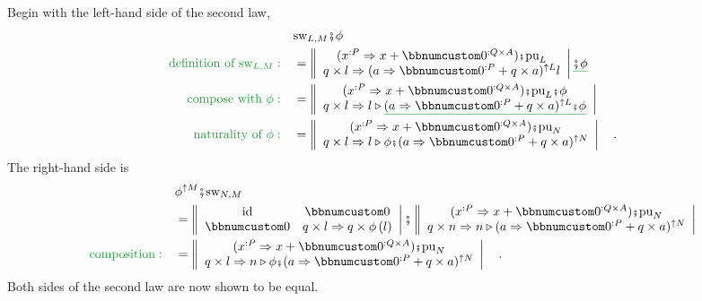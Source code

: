 Begin with the left-hand side of the second law,
\begin{align*}
 & \text{sw}_{L,M}\bef\phi\\
{\color{greenunder}\text{definition of }\text{sw}_{L,M}:}\quad & =\left\Vert \begin{array}{c}
(x^{:P}\Rightarrow x+\bbnum 0^{:Q\times A})\bef\text{pu}_{L}\\
q\times l\Rightarrow(a\Rightarrow\bbnum 0^{:P}+q\times a)^{\uparrow L}l
\end{array}\right|\gunderline{\bef\phi}\\
{\color{greenunder}\text{compose with }\phi:}\quad & =\left\Vert \begin{array}{c}
(x^{:P}\Rightarrow x+\bbnum 0^{:Q\times A})\bef\text{pu}_{L}\bef\phi\\
q\times l\Rightarrow l\triangleright\gunderline{(a\Rightarrow\bbnum 0^{:P}+q\times a)^{\uparrow L}\bef\phi}
\end{array}\right|\\
{\color{greenunder}\text{naturality of }\phi:}\quad & =\left\Vert \begin{array}{c}
(x^{:P}\Rightarrow x+\bbnum 0^{:Q\times A})\bef\text{pu}_{N}\\
q\times l\Rightarrow l\triangleright\phi\bef(a\Rightarrow\bbnum 0^{:P}+q\times a)^{\uparrow N}
\end{array}\right|\quad.
\end{align*}
The right-hand side is
\begin{align*}
 & \phi^{\uparrow M}\bef\text{sw}_{N,M}\\
 & =\left\Vert \begin{array}{cc}
\text{id} & \bbnum 0\\
\bbnum 0 & q\times l\Rightarrow q\times\phi\left(l\right)
\end{array}\right|\bef\left\Vert \begin{array}{c}
(x^{:P}\Rightarrow x+\bbnum 0^{:Q\times A})\bef\text{pu}_{N}\\
q\times n\Rightarrow n\triangleright(a\Rightarrow\bbnum 0^{:P}+q\times a)^{\uparrow N}
\end{array}\right|\\
{\color{greenunder}\text{composition}:}\quad & =\left\Vert \begin{array}{c}
(x^{:P}\Rightarrow x+\bbnum 0^{:Q\times A})\bef\text{pu}_{N}\\
q\times l\Rightarrow n\triangleright\phi\bef(a\Rightarrow\bbnum 0^{:P}+q\times a)^{\uparrow N}
\end{array}\right|\quad.
\end{align*}
Both sides of the second law are now shown to be equal.

